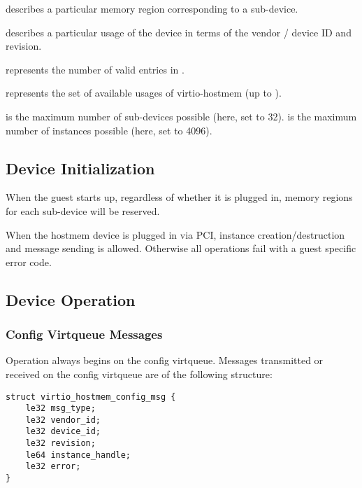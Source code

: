  describes a particular memory region
corresponding to a sub-device.

 describes a particular usage of the device
in terms of the vendor / device ID and revision.

 represents the number of valid entries in .

 represents the set of available usages of virtio-hostmem (up to ).

 is the maximum number of sub-devices possible (here, set to 32).
 is the maximum number of instances possible (here, set to 4096).

\subsection{Device Initialization}\label{sec:Device Types / Host Memory Device / Device Initialization}

When the guest starts up, regardless of whether it is plugged in,
memory regions for each sub-device will be reserved.

When the hostmem device is plugged in via PCI,
instance creation/destruction and message sending is allowed.
Otherwise all operations fail with a guest specific error code.

\subsection{Device Operation}\label{sec:Device Types / Host Memory Device / Device Operation}

\subsubsection{Config Virtqueue Messages}\label{sec:Device Types / Host Memory Device / Device Operation / Config Virtqueue Messages}

Operation always begins on the config virtqueue.
Messages transmitted or received on the config virtqueue are of the following structure:

\begin{lstlisting}
struct virtio_hostmem_config_msg {
    le32 msg_type;
    le32 vendor_id;
    le32 device_id;
    le32 revision;
    le64 instance_handle;
    le32 error;
}
\end{lstlisting}

